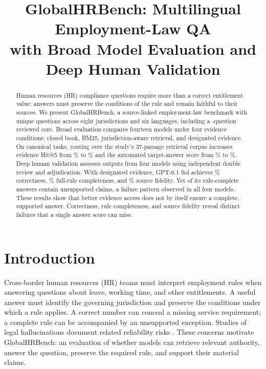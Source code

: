 \documentclass[11pt]{article}
\title{GlobalHRBench: Multilingual Employment-Law QA\\ with Broad Model Evaluation and Deep Human Validation}
\DeclareRobustCommand{\claim}[2]{#2}
\begin{document}
\maketitle
\raggedbottom
{}

\begin{abstract}
\claim{ABSTRACT}{Human resources (HR) compliance questions require more than a correct entitlement value: answers must preserve the conditions of the rule and remain faithful to their sources. We present GlobalHRBench, a source-linked employment-law benchmark with \RNResource{} unique questions across eight jurisdictions and six languages, including a \RNCore{}-question reviewed core. Broad evaluation compares fourteen models under four evidence conditions: closed book, BM25, jurisdiction-aware retrieval, and designated evidence. On \RNARRCore{} canonical tasks, routing over the study's 37-passage retrieval corpus increases evidence Hit@5 from \RBMHit\% to \RRouteHit\% and the automated target-answer score from \RBroadBM\% to \RBroadRoute\%. Deep human validation assesses \RNAudit{} outputs from four models using independent double review and adjudication. With designated evidence, GPT-6.1 Sol achieves \RSDCorrect\% correctness, \RSDFull\% full-rule completeness, and \RSDFidelity\% source fidelity. Yet \RSDUnsupported{} of its rule-complete answers contain unsupported claims, a failure pattern observed in all four models. These results show that better evidence access does not by itself ensure a complete, supported answer. Correctness, rule completeness, and source fidelity reveal distinct failures that a single answer score can miss.}
\end{abstract}

\section{Introduction}
\claim{INTRO}{Cross-border human resources (HR) teams must interpret employment rules when answering questions about leave, working time, and other entitlements. A useful answer must identify the governing jurisdiction and preserve the conditions under which a rule applies. A correct number can conceal a missing service requirement; a complete rule can be accompanied by an unsupported exception. Studies of legal hallucinations document related reliability risks \citep{dahl2024legalhallucinations,magesh2024hallucinationfree}. These concerns motivate GlobalHRBench: an evaluation of whether models can retrieve relevant authority, answer the question, preserve the required rule, and support their material claims.}
\end{document}
